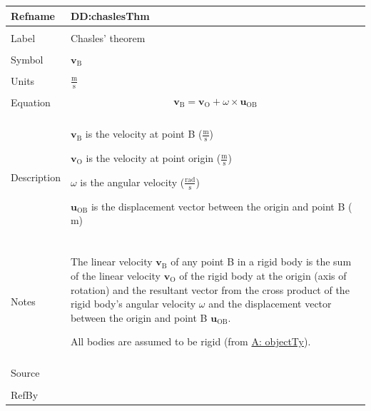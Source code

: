 \documentclass[12pt]{article}
\begin{document}
\vspace{\baselineskip}
\noindent
\begin{minipage}{\textwidth}
\begin{tabular}{>{\raggedright}p{}>{\raggedright\arraybackslash}p{}}
\toprule \textbf{Refname} & \textbf{DD:chaslesThm}
\label{DD:chaslesThm}
\\ \midrule \\
Label & Chasles' theorem
        
\\ \midrule \\
Symbol & ${\mathbf{v}_{\text{B}}}$
         
\\ \midrule \\
Units & $\frac{\text{m}}{\text{s}}$
        
\\ \midrule \\
Equation & \begin{displaymath}
           {\mathbf{v}_{\text{B}}}={\mathbf{v}_{\text{O}}}+ω\times{\mathbf{u}_{\text{O}\text{B}}}
           \end{displaymath}
\\ \midrule \\
Description & \begin{symbDescription}
              \item{${\mathbf{v}_{\text{B}}}$ is the velocity at point B ($\frac{\text{m}}{\text{s}}$)}
              \item{${\mathbf{v}_{\text{O}}}$ is the velocity at point origin ($\frac{\text{m}}{\text{s}}$)}
              \item{$ω$ is the angular velocity ($\frac{\text{rad}}{\text{s}}$)}
              \item{${\mathbf{u}_{\text{O}\text{B}}}$ is the displacement vector between the origin and point B (${\text{m}}$)}
              \end{symbDescription}
\\ \midrule \\
Notes & The linear velocity ${\mathbf{v}_{\text{B}}}$ of any point B in a rigid body is the sum of the linear velocity ${\mathbf{v}_{\text{O}}}$ of the rigid body at the origin (axis of rotation) and the resultant vector from the cross product of the rigid body's angular velocity $ω$ and the displacement vector between the origin and point B ${\mathbf{u}_{\text{O}\text{B}}}$.
        
        All bodies are assumed to be rigid (from \hyperref[assumpOT]{A: objectTy}).
        
\\ \midrule \\
Source & \cite{chaslesWiki}
         
\\ \midrule \\
RefBy & 
\\ \bottomrule
\end{tabular}
\end{minipage}
\end{document}
